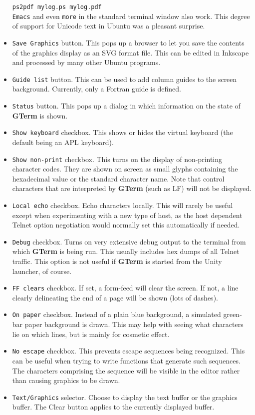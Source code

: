 \documentclass[a4paper,twoside,11pt]{article}
\begin{document}
\begin{itemize}
      \texttt{ps2pdf mylog.ps mylog.pdf}\\
      \texttt{Emacs} and even \texttt{more} in the standard terminal window also work. This degree of support for Unicode
      text in Ubuntu was a pleasant surprise.
\item \texttt{Save Graphics} button. This pops up a browser to let you save the contents of the graphics display as an SVG
      format file. This can be edited in Inkscape and processed by many other Ubuntu programs.
\item \texttt{Guide list} button. This can be used to add column guides to the screen background. Currently,
	only a Fortran guide is defined.
\item \texttt{Status} button. This pops up a dialog in which information on the state of \textbf{GTerm} is shown.
\item \texttt{Show keyboard} checkbox. This shows or hides the virtual keyboard (the default being an APL keyboard).
\item \texttt{Show non-print} checkbox. This turns on the display of non-printing character codes. They are shown on screen
      as small glyphs containing the hexadecimal value or the standard character name. Note that control characters that
      are interpreted by \textbf{GTerm} (such as LF) will not be displayed.
\item \texttt{Local echo} checkbox. Echo characters locally. This will rarely be useful except when experimenting with a new
      type of host, as the host dependent Telnet option negotiation would normally set this automatically if needed.
\item \texttt{Debug} checkbox. Turns on very extensive debug output to the terminal from which \textbf{GTerm} is being run. This usually
      includes hex dumps of all Telnet traffic. This option is not useful if \textbf{GTerm} is started from the Unity launcher, of course.
\item \texttt{FF clears} checkbox. If set, a form-feed will clear the screen. If not, a line clearly delineating the end of a
      page will be shown (lots of dashes).
\item \texttt{On paper} checkbox. Instead of a plain blue background, a simulated green-bar paper background is drawn. This may
      help with seeing what characters lie on which lines, but is mainly for cosmetic effect.
\item \texttt{No escape} checkbox. This prevents escape sequences being recognized. This can be useful when trying to
	write functions that generate such sequences. The characters comprising the sequence will be visible in the editor rather than
	causing graphics to be drawn.
\item \texttt{Text/Graphics} selector. Choose to display the text buffer or the graphics buffer. The Clear button applies to the
      currently displayed buffer.
\end{itemize} 
\end{document}
